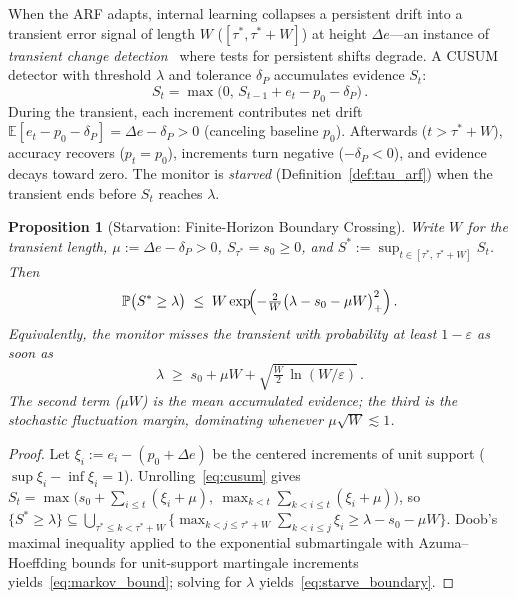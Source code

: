 \documentclass[10pt,conference]{IEEEtran}
\newtheorem{proposition}{Proposition}
\theoremstyle{definition}
\begin{document}
When the ARF adapts, internal learning collapses a persistent drift into a transient error signal of length $W$ ($[\tau^*, \tau^* + W]$) at height $\Delta e$---an instance of \emph{transient change detection}~\cite{nikiforov_2012,tartakovsky_2023_transient} where tests for persistent shifts degrade.
A CUSUM detector with threshold $\lambda$ and tolerance $\delta_P$ accumulates evidence $S_t$:
\begin{equation}\label{eq:cusum}
  S_t = \max\bigl(0,\, S_{t-1} + e_t - p_0 - \delta_P\bigr)\,.
\end{equation}
During the transient, each increment contributes net drift $\mathbb{E}[e_t - p_0 - \delta_P] = \Delta e - \delta_P > 0$ (canceling baseline $p_0$).
Afterwards ($t > \tau^* + W$), accuracy recovers ($p_t = p_0$), increments turn negative ($-\delta_P < 0$), and evidence decays toward zero. The monitor is \emph{starved} (Definition~\ref{def:tau_arf}) when the transient ends before $S_t$ reaches $\lambda$.

\begin{proposition}[Starvation: Finite-Horizon Boundary Crossing]\label{prop:starvation}
  Write $W$ for the transient length, $\mu := \Delta e - \delta_P > 0$, $S_{\tau^*} = s_0 \ge 0$, and $S^* := \sup_{t\in[\tau^*,\, \tau^* + W]} S_t$. Then
  \begin{equation}\label{eq:markov_bound}
    \mathbb{P}\bigl(S^* \ge \lambda\bigr) \;\le\; W \exp\!\Bigl(-\tfrac{2}{W}\bigl(\lambda - s_0 - \mu W\bigr)_{+}^{2}\Bigr)\,.
  \end{equation}
  Equivalently, the monitor misses the transient with probability at least $1-\varepsilon$ as soon as
  \begin{equation}\label{eq:starve_boundary}
    \lambda \;\ge\; s_0 + \mu W + \sqrt{\tfrac{W}{2}\,\ln(W/\varepsilon)}\,.
  \end{equation}
  The second term ($\mu W$) is the mean accumulated evidence; the third is the stochastic fluctuation margin, dominating whenever $\mu\sqrt{W} \lesssim 1$.
\end{proposition}

\begin{proof}
  Let $\xi_i := e_i - (p_0 + \Delta e)$ be the centered increments of unit support ($\sup \xi_i - \inf \xi_i = 1$). Unrolling~\eqref{eq:cusum} gives $S_t = \max\bigl(s_0 + \sum_{i \le t}(\xi_i + \mu),\ \max_{k < t}\sum_{k < i \le t}(\xi_i + \mu)\bigr)$, so $\{S^* \ge \lambda\} \subseteq \bigcup_{\tau^* \le k < \tau^* + W} \bigl\{\max_{k < j \le \tau^*+W}\sum_{k < i \le j}\xi_i \ge \lambda - s_0 - \mu W\bigr\}$. Doob's maximal inequality applied to the exponential submartingale with Azuma--Hoeffding bounds for unit-support martingale increments~\cite{hoeffding_1963,tartakovsky_2014} yields~\eqref{eq:markov_bound}; solving for $\lambda$ yields~\eqref{eq:starve_boundary}.
\end{proof}
\end{document}
